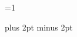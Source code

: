 \ifchorded
  \ifnum\value{AlwaysDisplayChords}=1
    \newcommand{\stopchords}{}
    \newcommand{\resumechords}{}
  \else
    \newcommand{\stopchords}{\chordsoff}
    \newcommand{\resumechords}{\chordson}
  \fi
\else
  \newcommand{\stopchords}{}
  \newcommand{\resumechords}{}
\fi

\newcommand{\stopchordsalways}{\chordsoff}
\newcommand{\resumechordsalways}{\chordson}
%

\newcommand\formatTwoDigits[1]{\ifnum#1<10 0\fi#1}


\noversenumbers

\versesep=5pt plus 2pt minus 2pt





\makeatletter
\renewcommand\SB@obeylines{%
  \let\obeyedline\SB@par%
  \obeylines%
  \let\@par\SB@@par%
}
\makeatother

